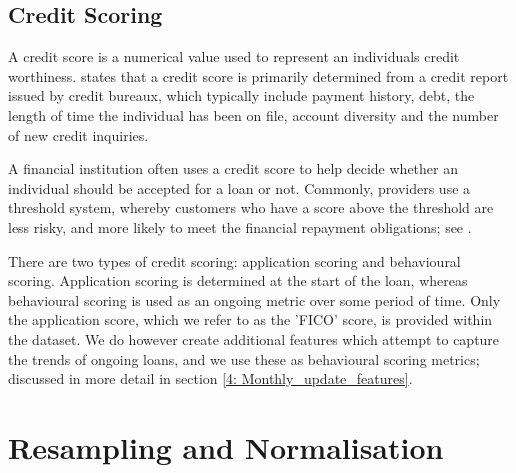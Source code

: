             
        \subsection{Credit Scoring}
            A credit score is a numerical value used to represent an individuals credit worthiness. \cite{risk_management1} states that a credit score is primarily determined from a credit report issued by credit bureaux, which typically include payment history, debt, the length of time the individual has been on file, account diversity and the number of new credit inquiries. 
            
            A financial institution often uses a credit score to help decide whether an individual should be accepted for a loan or not. Commonly, providers use a threshold system, whereby customers who have a score above the threshold are less risky, and more likely to meet the financial repayment obligations; see \cite{consumer_spending}. 
            
            There are two types of credit scoring: application scoring and behavioural scoring. Application scoring is determined at the start of the loan, whereas behavioural scoring is used as an ongoing metric over some period of time. Only the application score, which we refer to as the 'FICO' score, is provided within the dataset. We do however create additional features which attempt to capture the trends of ongoing loans, and we use these as behavioural scoring metrics; discussed in more detail in section \ref{4: Monthly_update_features}.
        
    \section{Resampling and Normalisation}
    
